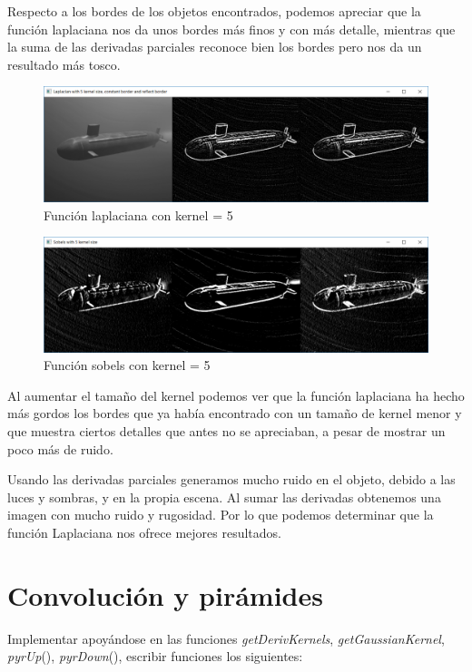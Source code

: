 \documentclass{article}
\begin{document}
Respecto a los bordes de los objetos encontrados, podemos apreciar que la función laplaciana nos da unos bordes más finos y con más detalle, mientras que la suma de las derivadas parciales reconoce bien los bordes pero nos da un resultado más tosco.

\begin{figure}[h]
\centering
\includegraphics[scale=0.5]{1c3.PNG}
\caption{Función laplaciana con kernel = 5}
\end{figure}


\begin{figure}[h]
\centering
\includegraphics[scale=0.5]{1c4.PNG}
\caption{Función sobels con kernel = 5}
\end{figure}


Al aumentar el tamaño del kernel podemos ver que la función laplaciana ha hecho más gordos los bordes que ya había encontrado con un tamaño de kernel menor y que muestra ciertos detalles que antes no se apreciaban, a pesar de mostrar un poco más de ruido.

Usando las derivadas parciales generamos mucho ruido en el objeto, debido a las luces y sombras, y en la propia escena. Al sumar las derivadas obtenemos una imagen con mucho ruido y rugosidad. Por lo que podemos determinar que la función Laplaciana nos ofrece mejores resultados.



\newpage
\section{Convolución y pirámides} %

Implementar apoyándose en las funciones \textit{getDerivKernels}, \textit{getGaussianKernel}, \textit{pyrUp}(), \textit{pyrDown}(), escribir funciones los siguientes:
\end{document}
